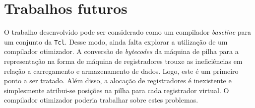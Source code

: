 


\section{Trabalhos futuros}

O trabalho desenvolvido pode ser considerado como um compilador
\textit{baseline} para um conjunto da \texttt{Tcl}. Desse modo, ainda
falta explorar a utilização de um compilador otimizador.
A conversão de \textit{bytecodes} da máquina de pilha para a
representação na forma de máquina de registradores trouxe as
ineficiências em relação a carregamento e armazenamento de
dados. Logo, este é um primeiro ponto a ser tratado. Além disso, a
alocação de registradores é inexistente e simplesmente atribui-se
posições na pilha para cada registrador virtual. O compilador
otimizador poderia trabalhar sobre estes problemas.

